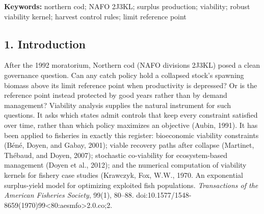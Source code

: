 \documentclass[11pt]{article}
\begin{document}
\begin{abstract}
set \(C^*\) lies in \([67.9, 95.2]\) kt --- pinned to within
\(27\) kt while \(K\) itself is not identified from above ---
whereas resampling the \(24\) transitions and refitting both
parameters freely disperses the estimate over a far wider range
(median \(73.7\) kt, \(90\%\) interval \([-89.4, 125.7]\), or
\(88.1\) kt (\([-5.6, 130.6]\)) restricted to the expansive regime on which the
results are conditional, \(73\%\) of replicates). The two answer
different questions and the tight one is an identification result, not a
precision one; 20-year survival from
the reference point falls from \(0.91\) to \(0.65\) between moratorium-level
and \(120\) kt removals. (5) Self-viability is regime-dependent: \(171\) kt
on the post-moratorium window, \(0 \pm 8\) kt on the modern series. On this
map the reference point is protected by good years, and reactive design
cannot buy protection with supply.

\end{abstract}

\textbf{Keywords:} northern cod; NAFO 2J3KL; surplus production;
viability; robust viability kernel; harvest control rules; limit
reference point

\subsection{1. Introduction}\label{budget-introduction}

After the 1992 moratorium, Northern cod (NAFO divisions 2J3KL) posed a
clean governance question. Can any catch policy hold a collapsed stock's
spawning biomass above its limit reference point when productivity is
depressed? Or is the reference point instead protected by good years
rather than by demand management? Viability analysis supplies the
natural instrument for such questions. It asks which states admit
controls that keep every constraint satisfied over time, rather than
which policy maximizes an objective (Aubin, 1991). It has been applied
to fisheries in exactly this register: bioeconomic viability constraints
(B\'en\'e, Doyen, and Gabay, 2001); viable recovery paths after collapse
(Martinet, Th\'ebaud, and Doyen, 2007); stochastic co-viability for
ecosystem-based management (Doyen et al., 2012); and the numerical
computation of viability kernels for fishery case studies (Krawczyk,
Fox, W.W., 1970. An exponential surplus-yield model for optimizing exploited fish
populations. \emph{Transactions of the American Fisheries Society}, 99(1), 80--88.
doi:10.1577/1548-8659(1970)99<80:aesmfo>2.0.co;2.
\end{document}
